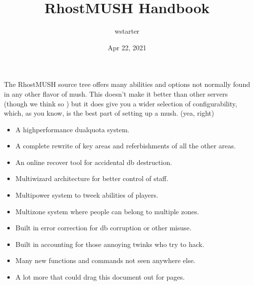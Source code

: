\documentclass[letterpaper,10pt,english]{sphinxmanual}
\title{RhostMUSH Handbook}
\date{Apr 22, 2021}
\author{wstarter}
\begin{document}
\pagestyle{empty}
\sphinxmaketitle
\pagestyle{plain}
\sphinxtableofcontents
\pagestyle{normal}
\label{\detokenize{index::doc}}


\sphinxAtStartPar
The RhostMUSH source tree offers many abilities and options
not normally found in any other flavor of mush.  This doesn’t
make it better than other servers (though we think so )
but it does give you a wider selection of configurability,
which, as you know, is the best part of setting up a mush.
(yea, right)
\begin{itemize}
\item {} 
\sphinxAtStartPar
A high\sphinxhyphen{}performance dual\sphinxhyphen{}quota system.

\item {} 
\sphinxAtStartPar
A complete rewrite of key areas and referbishments of all the other areas.

\item {} 
\sphinxAtStartPar
An on\sphinxhyphen{}line recover tool for accidental db destruction.

\item {} 
\sphinxAtStartPar
Multi\sphinxhyphen{}wizard architecture for better control of staff.

\item {} 
\sphinxAtStartPar
Multi\sphinxhyphen{}power system to tweek abilities of players.

\item {} 
\sphinxAtStartPar
Multi\sphinxhyphen{}zone system where people can belong to multiple zones.

\item {} 
\sphinxAtStartPar
Built in error correction for db corruption or other misuse.

\item {} 
\sphinxAtStartPar
Built in accounting for those annoying twinks who try to hack.

\item {} 
\sphinxAtStartPar
Many new functions and commands not seen anywhere else.

\item {} 
\sphinxAtStartPar
A lot more that could drag this document out for pages.

\end{itemize}
\end{document}
